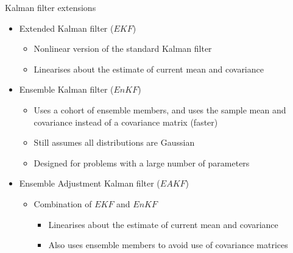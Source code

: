 \documentclass[10pt]{beamer}
\begin{document}
		\begin{frame}{Kalman filter extensions}
			\begin{itemize}
				\item Extended Kalman filter ($EKF$)
					\begin{itemize}
					 	\item Nonlinear version of the standard Kalman filter
					 	\item Linearises about the estimate of current mean and covariance
					\end{itemize}
				\item Ensemble Kalman filter ($EnKF$) 
					\begin{itemize}
						\item Uses a cohort of ensemble members, and uses the sample mean and covariance instead of a covariance matrix (faster)
						\item Still assumes all distributions are Gaussian
						\item Designed for problems with a large number of parameters
					\end{itemize}
				\item Ensemble Adjustment Kalman filter ($EAKF$) 
					\begin{itemize}
						\item Combination of $EKF$ and $EnKF$ 
						\begin{itemize}
							\item Linearises about the estimate of current mean and covariance
							\item Also uses ensemble members to avoid use of covariance matrices
						\end{itemize}
					\end{itemize}
			\end{itemize}
		\end{frame}
\end{document}
